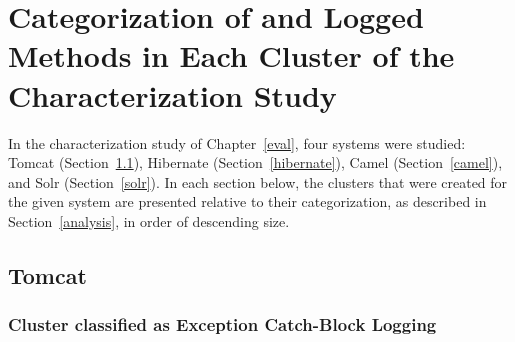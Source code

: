 
\chapter{Categorization of and Logged Methods in Each Cluster of the Characterization Study}\label{appendB}

In the characterization study of Chapter~\ref{eval}, four systems were studied: Tomcat (Section~\ref{tomcat}), Hibernate (Section~\ref{hibernate}), Camel (Section~\ref{camel}), and Solr (Section~\ref{solr}). In each section below, the clusters that were created for the given system are presented relative to their categorization, as described in Section~\ref{analysis}, in order of descending size.

\section{Tomcat}\label{tomcat}

\subsection{Cluster classified as Exception Catch-Block Logging}

